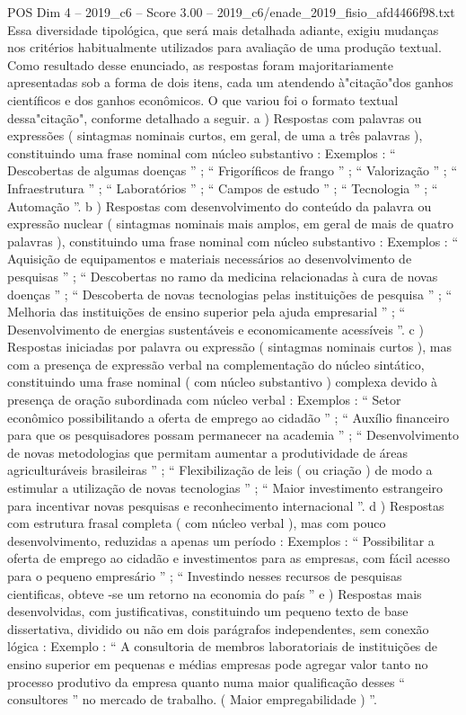 \begin{textsample}{POS Dim 4 – 2019\_c6 – Score 3.00 – 2019\_c6/enade\_2019\_fisio\_afd4466f98.txt}
Essa diversidade tipológica, que será mais detalhada adiante, exigiu mudanças nos critérios habitualmente utilizados para avaliação de uma produção textual.
Como resultado desse enunciado, as respostas foram majoritariamente apresentadas sob a forma de dois itens, cada um atendendo à"citação"dos ganhos científicos e dos ganhos econômicos.
O que variou foi o formato textual dessa"citação", conforme detalhado a seguir. a ) Respostas com palavras ou expressões ( sintagmas nominais curtos, em geral, de uma a três palavras ), constituindo uma frase nominal com núcleo substantivo : Exemplos : “ Descobertas de algumas doenças ” ; “ Frigoríficos de frango ” ; “ Valorização ” ; “ Infraestrutura ” ; “ Laboratórios ” ; “ Campos de estudo ” ; “ Tecnologia ” ; “ Automação ”. b ) Respostas com desenvolvimento do conteúdo da palavra ou expressão nuclear ( sintagmas nominais mais amplos, em geral de mais de quatro palavras ), constituindo uma frase nominal com núcleo substantivo : Exemplos : “ Aquisição de equipamentos e materiais necessários ao desenvolvimento de pesquisas ” ; “ Descobertas no ramo da medicina relacionadas à cura de novas doenças ” ; “ Descoberta de novas tecnologias pelas instituições de pesquisa ” ; “ Melhoria das instituições de ensino superior pela ajuda empresarial ” ; “ Desenvolvimento de energias sustentáveis e economicamente acessíveis ”. c ) Respostas iniciadas por palavra ou expressão ( sintagmas nominais curtos ), mas com a presença de expressão verbal na complementação do núcleo sintático, constituindo uma frase nominal ( com núcleo substantivo ) complexa devido à presença de oração subordinada com núcleo verbal : Exemplos : “ Setor econômico possibilitando a oferta de emprego ao cidadão ” ; “ Auxílio financeiro para que os pesquisadores possam permanecer na academia ” ; “ Desenvolvimento de novas metodologias que permitam aumentar a produtividade de áreas agriculturáveis brasileiras ” ; “ Flexibilização de leis ( ou criação ) de modo a estimular a utilização de novas tecnologias ” ; “ Maior investimento estrangeiro para incentivar novas pesquisas e reconhecimento internacional ”. d ) Respostas com estrutura frasal completa ( com núcleo verbal ), mas com pouco desenvolvimento, reduzidas a apenas um período : Exemplos : “ Possibilitar a oferta de emprego ao cidadão e investimentos para as empresas, com fácil acesso para o pequeno empresário ” ; “ Investindo nesses recursos de pesquisas cientificas, obteve -se um retorno na economia do país ” e ) Respostas mais desenvolvidas, com justificativas, constituindo um pequeno texto de base dissertativa, dividido ou não em dois parágrafos independentes, sem conexão lógica : Exemplo : “ A consultoria de membros laboratoriais de instituições de ensino superior em pequenas e médias empresas pode agregar valor tanto no processo produtivo da empresa quanto numa maior qualificação desses “ consultores ” no mercado de trabalho. ( Maior empregabilidade ) ”.

\end{textsample}
